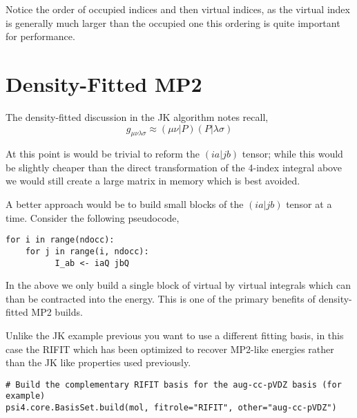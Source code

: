 \documentclass[aip,jcp,preprint,superscriptaddress,floatfix]{revtex4-1}
\begin{document}
Notice the order of occupied indices and then virtual indices, as the virtual index is generally much larger than the occupied one this ordering is quite important for performance.

\section{Density-Fitted MP2}

The density-fitted discussion in the JK algorithm notes recall,
\begin{equation}
\label{eq:dferi}
g_{\mu \nu \lambda \sigma} \approx (\mu \nu |P) (P| \lambda \sigma)
\end{equation}

At this point is would be trivial to reform the $(ia|jb)$ tensor; while this would be slightly cheaper than the
direct transformation of the 4-index integral above we would still create a large matrix in memory which is best avoided. 

A better approach would be to build small blocks of the $(ia|jb)$ tensor at a time. Consider the following pseudocode,

\begin{verbatim}
for i in range(ndocc):
    for j in range(i, ndocc):
          I_ab <- iaQ jbQ
\end{verbatim}

In the above we only build a single block of virtual by virtual integrals which can than be contracted into the energy. This is one of the primary benefits of density-fitted MP2 builds.

Unlike the JK example previous you want to use a different fitting basis, in this case the RIFIT which has been optimized to recover MP2-like energies rather than the JK like properties used previously.

\begin{verbatim}
# Build the complementary RIFIT basis for the aug-cc-pVDZ basis (for example)
psi4.core.BasisSet.build(mol, fitrole="RIFIT", other="aug-cc-pVDZ")
\end{verbatim}



\end{document}
